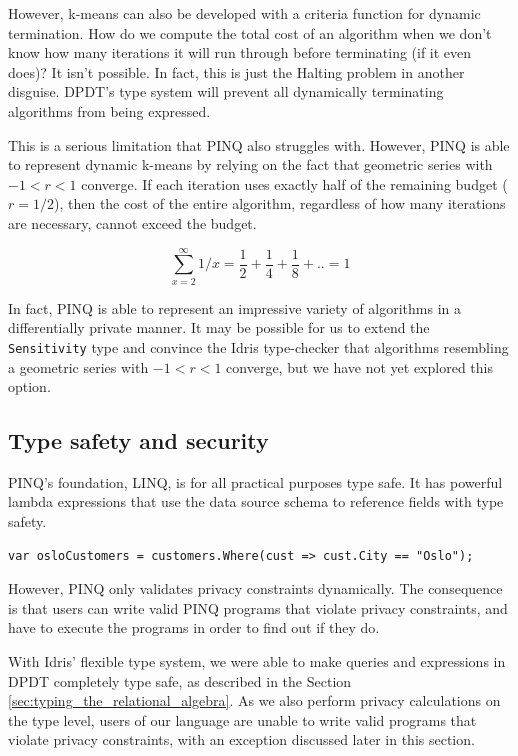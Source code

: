 \documentclass[12pt]{article}
\begin{document}
However, k-means can also be developed with a criteria function for dynamic termination.
How do we compute the total cost of an algorithm when we don't know how many iterations it will run through before terminating (if it even does)?
It isn't possible.
In fact, this is just the Halting problem in another disguise.
DPDT's type system will prevent all dynamically terminating algorithms from being expressed.

This is a serious limitation that PINQ also struggles with.
However, PINQ is able to represent dynamic k-means by relying on the fact that geometric series with $-1 < r < 1$ converge.
If each iteration uses exactly half of the remaining budget ($r=1/2$), then the cost of the entire algorithm, regardless of how many iterations are necessary, cannot exceed the budget.

$$\sum_{x=2}^{\infty} 1/x = \frac{1}{2} + \frac{1}{4} + \frac{1}{8} + .. = 1$$

In fact, PINQ is able to represent an impressive variety of algorithms in a differentially private manner.
It may be possible for us to extend the \texttt{Sensitivity} type and convince the Idris type-checker that algorithms resembling a geometric series with $-1 < r < 1$ converge, but we have not yet explored this option.

\subsection{Type safety and security}

PINQ's foundation, LINQ, is for all practical purposes type safe.
It has powerful lambda expressions that use the data source schema to reference fields with type safety.

\begin{lstlisting}[caption = Where query in LINQ, captionpos=b]
var osloCustomers = customers.Where(cust => cust.City == "Oslo"); 
\end{lstlisting}

However, PINQ only validates privacy constraints dynamically.
The consequence is that users can write valid PINQ programs that violate privacy constraints, and have to execute the programs in order to find out if they do.

With Idris' flexible type system, we were able to make queries and expressions in DPDT completely type safe, as described in the Section \ref{sec:typing_the_relational_algebra}.
As we also perform privacy calculations on the type level, users of our language are unable to write valid programs that violate privacy constraints, with an exception discussed later in this section.
\end{document}
